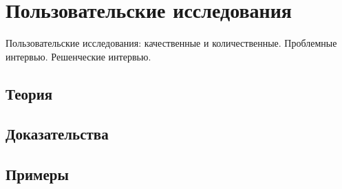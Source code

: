 
\section{Пользовательские исследования}
\label{sec:2.6.13-user-research}

\begin{ticket}
Пользовательские исследования: качественные и количественные. Проблемные интервью. Решенческие интервью.
\end{ticket}

\subsection*{Теория}

\subsection*{Доказательства}

\subsection*{Примеры}
